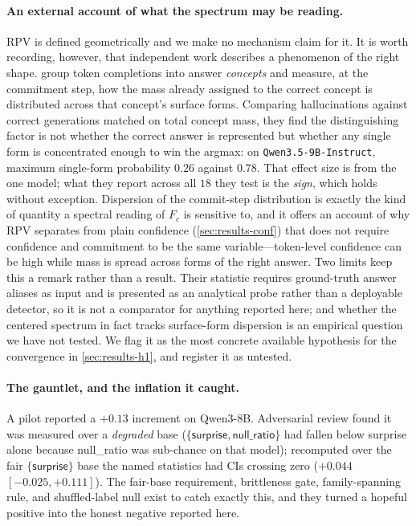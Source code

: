 \documentclass[10pt, letterpaper]{article}
\newcommand{\Fc}{F_{c}}
\newcommand{\nullr}{\textsf{null\_ratio}}
\begin{document}
\paragraph{An external account of what the spectrum may be reading.}
RPV is defined geometrically and we make no mechanism claim for it. It is
worth recording, however, that independent work describes a phenomenon of
the right shape. \citet{yeom2026commitment} group token completions into
answer \emph{concepts} and measure, at the commitment step, how the mass
already assigned to the correct concept is distributed across that
concept's surface forms. Comparing hallucinations against correct
generations matched on total concept mass, they find the distinguishing
factor is not whether the correct answer is represented but whether any
single form is concentrated enough to win the argmax: on
\texttt{Qwen3.5-9B-Instruct}, maximum single-form probability $0.26$
against $0.78$. That effect size is from the one model; what they report
across all $18$ they test is the \emph{sign}, which holds without
exception. Dispersion of the commit-step distribution is
exactly the kind of quantity a spectral reading of $\Fc$ is sensitive to,
and it offers an account of why RPV separates from plain confidence
(\cref{sec:results-conf}) that does not require confidence and commitment
to be the same variable---token-level confidence can be high while mass
is spread across forms of the right answer. Two limits keep this a
remark rather than a result. Their statistic requires ground-truth answer
aliases as input and is presented as an analytical probe rather than a
deployable detector, so it is not a comparator for anything reported
here; and whether the centered spectrum in fact tracks surface-form
dispersion is an empirical question we have not tested. We flag it as the
most concrete available hypothesis for the convergence in
\cref{sec:results-h1}, and register it as untested.

\paragraph{The gauntlet, and the inflation it caught.}
A pilot reported a $+0.13$ increment on Qwen3-8B. Adversarial review
found it was measured over a \emph{degraded} base
($\{\textsf{surprise},\nullr{}\}$ had fallen below surprise alone
because \nullr{} was sub-chance on that model); recomputed over the
fair $\{\textsf{surprise}\}$ base the named statistics had CIs crossing
zero ($+0.044$ $[-0.025,+0.111]$). The fair-base requirement,
brittleness gate, family-spanning rule, and shuffled-label null exist
to catch exactly this, and they turned a hopeful positive into the
honest negative reported here.
\end{document}
